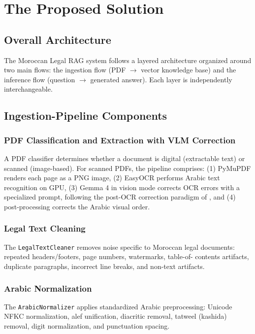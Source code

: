 \section{The Proposed Solution}
\label{sec:solution}

\subsection{Overall Architecture}

The Moroccan Legal RAG system follows a layered architecture organized around
two main flows: the ingestion flow (PDF $\rightarrow$ vector knowledge base)
and the inference flow (question $\rightarrow$ generated answer). Each layer
is independently interchangeable.

\subsection{Ingestion-Pipeline Components}

\subsubsection{PDF Classification and Extraction with VLM Correction}

A PDF classifier determines whether a document is digital (extractable text)
or scanned (image-based). For scanned PDFs, the pipeline comprises: (1)
PyMuPDF renders each page as a PNG image, (2) EasyOCR performs Arabic text
recognition on GPU, (3) Gemma 4 in vision mode corrects OCR errors with a
specialized prompt, following the post-OCR correction paradigm of
\cite{benajiba2023arabic}, and (4) post-processing corrects the Arabic
visual order.

\subsubsection{Legal Text Cleaning}

The \texttt{LegalTextCleaner} removes noise specific to Moroccan legal
documents: repeated headers/footers, page numbers, watermarks, table-of-
contents artifacts, duplicate paragraphs, incorrect line breaks, and
non-text artifacts.

\subsubsection{Arabic Normalization}

The \texttt{ArabicNormalizer} applies standardized Arabic preprocessing:
Unicode NFKC normalization, alef unification, diacritic removal, tatweel
(kashida) removal, digit normalization, and punctuation spacing.

